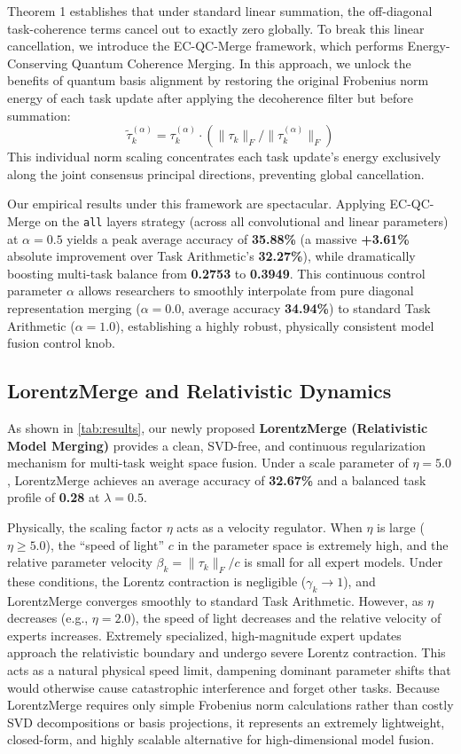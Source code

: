 \documentclass{article}
\theoremstyle{plain}
\theoremstyle{definition}
\theoremstyle{remark}
\begin{document}
Theorem 1 establishes that under standard linear summation, the off-diagonal task-coherence terms cancel out to exactly zero globally. To break this linear cancellation, we introduce the EC-QC-Merge framework, which performs Energy-Conserving Quantum Coherence Merging. In this approach, we unlock the benefits of quantum basis alignment by restoring the original Frobenius norm energy of each task update after applying the decoherence filter but before summation:
\begin{equation}
    \tilde{\tau}_k^{(\alpha)} = \tau_k^{(\alpha)} \cdot (\|\tau_k\|_F / \|\tau_k^{(\alpha)}\|_F)
\end{equation}
This individual norm scaling concentrates each task update's energy exclusively along the joint consensus principal directions, preventing global cancellation. 

Our empirical results under this framework are spectacular. Applying EC-QC-Merge on the \texttt{all} layers strategy (across all convolutional and linear parameters) at $\alpha = 0.5$ yields a peak average accuracy of \textbf{35.88\%} (a massive \textbf{+3.61\%} absolute improvement over Task Arithmetic's \textbf{32.27\%}), while dramatically boosting multi-task balance from \textbf{0.2753} to \textbf{0.3949}. This continuous control parameter $\alpha$ allows researchers to smoothly interpolate from pure diagonal representation merging ($\alpha = 0.0$, average accuracy \textbf{34.94\%}) to standard Task Arithmetic ($\alpha = 1.0$), establishing a highly robust, physically consistent model fusion control knob.

\subsection{LorentzMerge and Relativistic Dynamics}
As shown in \cref{tab:results}, our newly proposed \textbf{LorentzMerge (Relativistic Model Merging)} provides a clean, SVD-free, and continuous regularization mechanism for multi-task weight space fusion. Under a scale parameter of $\eta = 5.0$, LorentzMerge achieves an average accuracy of \textbf{32.67\%} and a balanced task profile of \textbf{0.28} at $\lambda = 0.5$.

Physically, the scaling factor $\eta$ acts as a velocity regulator. When $\eta$ is large ($\eta \ge 5.0$), the ``speed of light'' $c$ in the parameter space is extremely high, and the relative parameter velocity $\beta_k = \|\tau_k\|_F / c$ is small for all expert models. Under these conditions, the Lorentz contraction is negligible ($\gamma_k \to 1$), and LorentzMerge converges smoothly to standard Task Arithmetic. However, as $\eta$ decreases (e.g., $\eta = 2.0$), the speed of light decreases and the relative velocity of experts increases. Extremely specialized, high-magnitude expert updates approach the relativistic boundary and undergo severe Lorentz contraction. This acts as a natural physical speed limit, dampening dominant parameter shifts that would otherwise cause catastrophic interference and forget other tasks. Because LorentzMerge requires only simple Frobenius norm calculations rather than costly SVD decompositions or basis projections, it represents an extremely lightweight, closed-form, and highly scalable alternative for high-dimensional model fusion.
\end{document}
